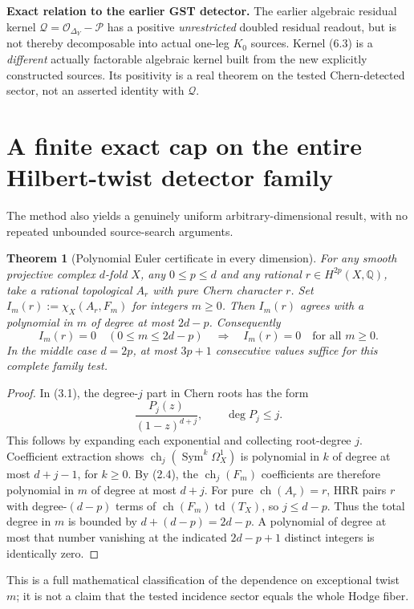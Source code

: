 \documentclass[11pt]{article}
\newcommand{\Q}{\mathbb Q}
\newcommand{\ch}{\operatorname{ch}}
\newcommand{\td}{\operatorname{td}}
\newcommand{\Sym}{\operatorname{Sym}}
\newtheorem{theorem}{Theorem}[section]
\begin{document}
\noindent\textbf{Exact relation to the earlier GST detector.}
The earlier algebraic residual kernel
\(\mathscr Q=\mathcal O_{\Delta_Y}-\mathscr P\)
has a positive \emph{unrestricted} doubled residual readout,
but is not thereby decomposable into actual one-leg \(K_0\)
sources. Kernel (6.3) is a \emph{different} actually
factorable algebraic kernel built from the new explicitly
constructed sources. Its positivity is a real theorem on
the tested Chern-detected sector, not an asserted identity
with \(\mathscr Q\).

\section{A finite exact cap on the entire Hilbert-twist detector family}
The method also yields a genuinely uniform arbitrary-dimensional
result, with no repeated unbounded source-search arguments.

\begin{theorem}[Polynomial Euler certificate in every dimension]
For any smooth projective complex \(d\)-fold \(X\), any
\(0\le p\le d\) and any rational \(r\in H^{2p}(X,\Q)\),
take a rational topological \(A_r\) with pure Chern character
\(r\). Set
\(
 I_m(r):=\chi_X(A_r,F_m)
\)
for integers \(m\ge0\). Then \(I_m(r)\) agrees with a
polynomial in \(m\) of degree at most \(2d-p\).
Consequently
\[
 I_m(r)=0\quad(0\le m\le 2d-p)
 \quad\Longrightarrow\quad
 I_m(r)=0\quad\text{for all }m\ge0.                 \tag{7.1}
\]
In the middle case \(d=2p\), at most \(3p+1\) consecutive
values suffice for this complete family test.
\end{theorem}
\begin{proof}
In (3.1), the degree-\(j\) part in Chern roots has the form
\[
       \frac{P_j(z)}{(1-z)^{d+j}},
       \qquad \deg P_j\le j.
\]
This follows by expanding each exponential and collecting
root-degree \(j\). Coefficient extraction shows
\(\ch_j(\Sym^k\Omega_X^1)\) is polynomial in \(k\) of degree
at most \(d+j-1\), for \(k\ge0\). By (2.4), the
\(\ch_j(F_m)\) coefficients are therefore polynomial in
\(m\) of degree at most \(d+j\). For pure \(\ch(A_r)=r\),
HRR pairs \(r\) with degree-\((d-p)\) terms of
\(\ch(F_m)\td(T_X)\), so \(j\le d-p\). Thus the total
degree in \(m\) is bounded by
\(d+(d-p)=2d-p\). A polynomial of degree at most that
number vanishing at the indicated \(2d-p+1\) distinct
integers is identically zero.
\end{proof}
This is a full mathematical classification of the dependence
on exceptional twist \(m\); it is not a claim that the
tested incidence sector equals the whole Hodge fiber.
\end{document}
